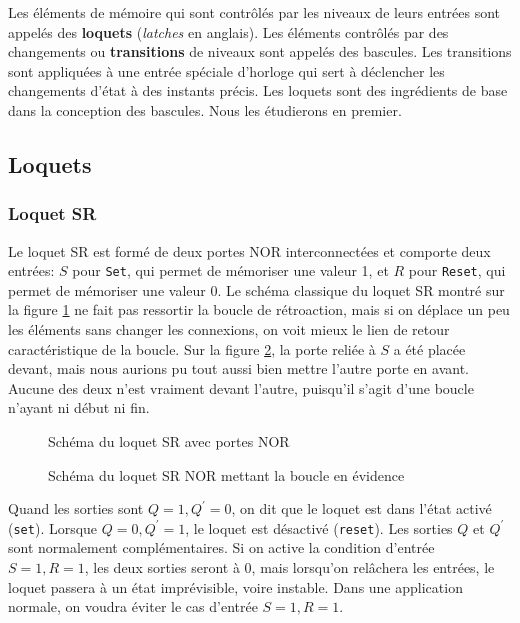 \documentclass[11pt]{article}
\begin{document}
Les éléments de mémoire qui sont contrôlés par les niveaux de leurs
entrées sont appelés des \textbf{loquets} (\emph{latches} en anglais). Les
éléments contrôlés par des changements ou \textbf{transitions} de niveaux
sont appelés des bascules. Les transitions sont appliquées à une
entrée spéciale d'horloge qui sert à déclencher les changements d'état
à des instants précis. Les loquets sont des ingrédients de base dans
la conception des bascules. Nous les étudierons en premier.

\subsection{Loquets}
\label{sec:org99286f8}

\subsubsection{Loquet SR}
\label{sec:org2788f84}

Le loquet SR est formé de deux portes NOR interconnectées et comporte
deux entrées: \(S\) pour \texttt{Set}, qui permet de mémoriser une valeur 1,
et \(R\) pour \texttt{Reset}, qui permet de mémoriser une valeur 0. Le schéma
classique du loquet SR montré sur la figure \ref{fig:org57becaa} ne fait pas
ressortir la boucle de rétroaction, mais si on déplace un peu les
éléments sans changer les connexions, on voit mieux le lien de retour
caractéristique de la boucle. Sur la figure \ref{fig:orga3adc86}, la porte reliée
à \(S\) a été placée devant, mais nous aurions pu tout aussi bien
mettre l'autre porte en avant. Aucune des deux n'est vraiment devant
l'autre, puisqu'il s'agit d'une boucle n'ayant ni début ni fin.

\begin{figure}[htbp]
\centering

\caption{\label{fig:org57becaa}Schéma du loquet SR avec portes NOR}
\end{figure}


\begin{figure}[htbp]
\centering

\caption{\label{fig:orga3adc86}Schéma du loquet SR NOR mettant la boucle en évidence}
\end{figure}

Quand les sorties sont \(Q=1, Q^\prime=0\), on dit que le loquet est
dans l'état activé (\texttt{set}). Lorsque \(Q=0, Q^\prime=1\), le loquet
est désactivé (\texttt{reset}). Les sorties \(Q\) et \(Q^\prime\) sont
normalement complémentaires. Si on active la condition d'entrée \(S=1,
R=1\), les deux sorties seront à 0, mais lorsqu'on relâchera les
entrées, le loquet passera à un état imprévisible, voire
instable. Dans une application normale, on voudra éviter le cas
d'entrée \(S=1, R=1\). 
\end{document}
